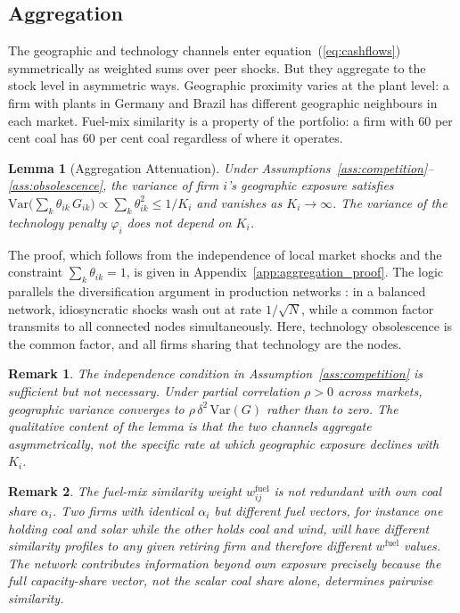 \documentclass[12pt,a4paper]{article}
\newtheorem{lemma}{Lemma}
\newtheorem{remark}{Remark}
\begin{document}
\subsection{Aggregation}\label{sec:aggregation}

The geographic and technology channels enter equation~(\ref{eq:cashflows}) symmetrically as weighted sums over peer shocks. But they aggregate to the stock level in asymmetric ways. Geographic proximity varies at the plant level: a firm with plants in Germany and Brazil has different geographic neighbours in each market. Fuel-mix similarity is a property of the portfolio: a firm with 60 per cent coal has 60 per cent coal regardless of where it operates.

\begin{lemma}[Aggregation Attenuation]\label{lem:aggregation}
    Under Assumptions~\ref{ass:competition}--\ref{ass:obsolescence}, the variance of firm $i$'s geographic exposure satisfies $\mathrm{Var}\!\bigl(\sum_k \theta_{ik}\, G_{ik}\bigr) \propto \sum_k \theta_{ik}^2 \leq 1/K_i$ and vanishes as $K_i \to \infty$. The variance of the technology penalty $\varphi_i$ does not depend on $K_i$.
\end{lemma}

\noindent The proof, which follows from the independence of local market shocks and the constraint $\sum_k \theta_{ik} = 1$, is given in Appendix~\ref{app:aggregation_proof}. The logic parallels the diversification argument in production networks \citep{AcemogluCarvalhoOzdaglarTahbazSalehi2012}: in a balanced network, idiosyncratic shocks wash out at rate $1/\sqrt{N}$, while a common factor transmits to all connected nodes simultaneously. Here, technology obsolescence is the common factor, and all firms sharing that technology are the nodes.

\begin{remark}\label{rem:aggregation_scope}
    The independence condition in Assumption~\ref{ass:competition} is sufficient but not necessary. Under partial correlation $\rho > 0$ across markets, geographic variance converges to $\rho \, \delta^2 \, \mathrm{Var}(G)$ rather than to zero. The qualitative content of the lemma is that the two channels aggregate asymmetrically, not the specific rate at which geographic exposure declines with $K_i$.
\end{remark}

\begin{remark}\label{rem:network_valueadded}
    The fuel-mix similarity weight $w^{\mathrm{fuel}}_{ij}$ is not redundant with own coal share $\alpha_i$. Two firms with identical $\alpha_i$ but different fuel vectors, for instance one holding coal and solar while the other holds coal and wind, will have different similarity profiles to any given retiring firm and therefore different $w^{\mathrm{fuel}}$ values. The network contributes information beyond own exposure precisely because the full capacity-share vector, not the scalar coal share alone, determines pairwise similarity.
\end{remark}
\end{document}
